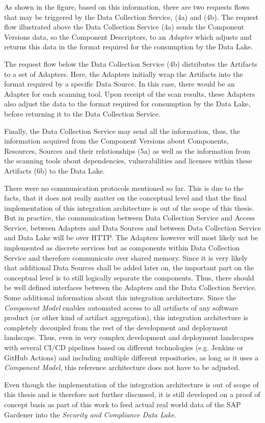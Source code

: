 As shown in the figure, based on this information, there are two requests flows that may be triggered by the Data Collection Service, (4a) and (4b). The request flow illustrated above the Data Collection Service (4a) sends the Component Versions data, so the Component Descriptors, to an \emph{Adapter} which adjusts and returns this data in the format required for the consumption by the Data Lake.\par 
The request flow below the Data Collection Service (4b) distributes the Artifacts to a set of Adapters. Here, the Adapters initially wrap the Artifacts into the format required by a specific Data Source. In this case, there would be an Adapter for each scanning tool. Upon receipt of the scan results, these Adapters also adjust the data to the format required for consumption by the Data Lake, before returning it to the Data Collection Service.\par 
Finally, the Data Collection Service may send all the information, thus, the information acquired from the Component Versions about Components, Resources, Sources and their relationships (5a) as well as the information from the scanning tools about dependencies, vulnerabilities and licenses within these Artifacts (6b) to the Data Lake.\par
There were no communication protocols mentioned so far. This is due to the facts, that it does not really matter on the conceptual level and that the final implementation of this integration architecture is out of the scope of this thesis. But in practice, the communication between Data Collection Service and Access Service, between Adapters and Data Sources and between Data Collection Service and Data Lake will be over HTTP. The Adapters however will most likely not be implemented as discrete services but as components within Data Collection Service and therefore communicate over shared memory. Since it is very likely that additional Data Sources shall be added later on, the important part on the conceptual level is to still logically separate the components. Thus, there should be well defined interfaces between the Adapters and the Data Collection Service.\\

Some additional information about this integration architecture. Since the \emph{Component Model} enables automated access to all artifacts of any software product (or other kind of artifact aggregation), this integration architecture is completely decoupled from the rest of the development and deployment landscape. Thus, even in very complex development and deployment landscapes with several CI/CD pipelines based on different technologies (e.g. Jenkins or GitHub Actions) and including multiple different repositories, as long as it uses a \emph{Component Model}, this reference architecture does not have to be adjusted.\par
Even though the implementation of the integration architecture is out of scope of this thesis and is therefore not further discussed, it is still developed on a proof of concept basis as part of this work to feed actual real world data of the SAP Gardener into the \emph{Security and Compliance Data Lake}.

